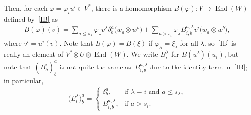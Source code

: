 \documentclass[pdftex]{sigma}
\numberwithin{equation}{section}
\DeclareMathOperator{\End}{End}
\begin{document}
Then, for each $\varphi=\varphi_i u^i \in V^*$, there is a homomorphism $B(\varphi)\colon V \to
\End(W)$ def\/ined by~\eqref{IB} as
\begin{gather*}
B(\varphi)(v) =
\sum_{a \leq s_\lambda}
\varphi_\lambda v^\lambda \delta^a_b \big(w_a \otimes w^b\big) +
\sum_{a>s_i} \varphi_\lambda B^{a,\lambda}_{i,b} v^i \big(w_a \otimes w^b\big),
\label{IBphi}
\end{gather*}
where $v^i = u^i(v)$.  Note that $B(\varphi) = B(\xi)$ if $\varphi_\lambda = \xi_\lambda$ for all
$\lambda$, so~\eqref{IB} is really an element of $V^* \otimes U \otimes
\End(W)$.
We write $B^\lambda_i$ for $B(u^\lambda)(u_i)$, but note that
$(B_\lambda^i)^a_b$ is not
quite the same as~$B^{a,\lambda}_{i,b}$  due to the identity term in~\eqref{IB}; in particular,
\begin{gather*}
\big(B^\lambda_i\big)^a_b =
\begin{cases}
\delta^a_b, & \text{if $\lambda=i$ and $a \leq s_\lambda$},\\
B^{a,\lambda}_{i,b}, & \text{if $a>s_i$}.
\end{cases}
\label{IBcomp}
\end{gather*}
\end{document}
